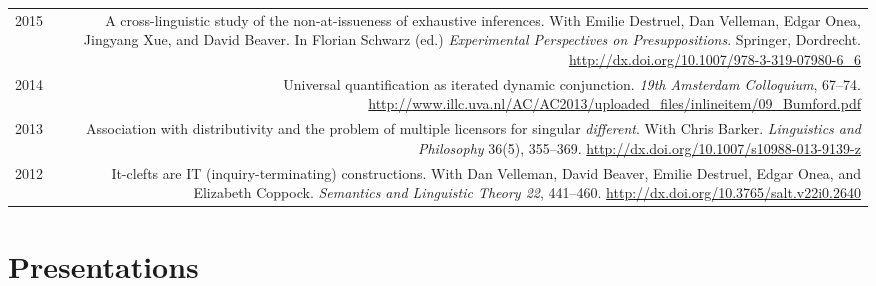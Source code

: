 \documentclass[12pt]{article}
\newcommand{\doi}[1]{\url{http://dx.doi.org/#1}}
\newcommand{\refmark}{\textcolor{gray}{\textdagger}}
\begin{document}
\begin{longtable}{LR}
  2015  & A cross-linguistic study of the non-at-issueness of exhaustive
          inferences.\newline
          With Emilie Destruel, Dan Velleman, Edgar Onea, Jingyang Xue, and
          David Beaver.\newline
          In Florian Schwarz (ed.) \textit{Experimental Perspectives on
          Presuppositions}. Springer, Dordrecht.\newline
          \doi{10.1007/978-3-319-07980-6_6}\\ %
  2014  & Universal quantification as iterated dynamic conjunction.\newline
          \textit{19th Amsterdam Colloquium}, 67--74.\newline
          \url{http://www.illc.uva.nl/AC/AC2013/uploaded_files/inlineitem/09_Bumford.pdf}\\
  2013  & Association with distributivity and the problem of multiple
          licensors for singular \textit{different}.\newline
          With Chris Barker.\newline
          \textit{Linguistics and Philosophy} 36(5), 355--369.\newline
          \doi{10.1007/s10988-013-9139-z}\\ %
  2012  & It-clefts are IT (inquiry-terminating) constructions.\newline
          With Dan Velleman, David Beaver, Emilie Destruel, Edgar Onea, and
          Elizabeth Coppock.\newline
          \textit{Semantics and Linguistic Theory 22}, 441--460.\newline
          \doi{10.3765/salt.v22i0.2640}
\end{longtable}
\endgroup

\medskip

\section*{Presentations}
\end{document}
